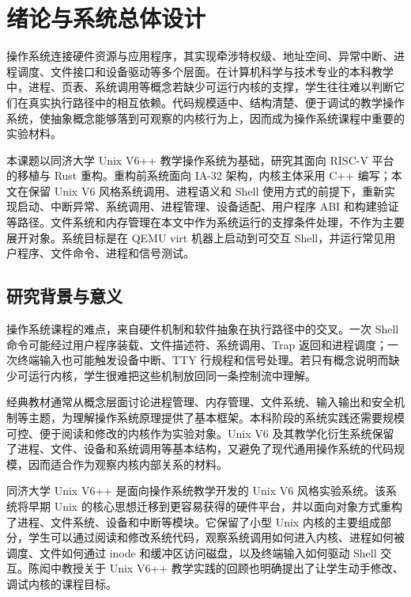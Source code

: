 \chapter{绪论与系统总体设计}\label{chap:introduction}

操作系统连接硬件资源与应用程序，其实现牵涉特权级、地址空间、异常中断、进程调度、文件接口和设备驱动等多个层面。在计算机科学与技术专业的本科教学中，进程、页表、系统调用等概念若缺少可运行内核的支撑，学生往往难以判断它们在真实执行路径中的相互依赖。代码规模适中、结构清楚、便于调试的教学操作系统，使抽象概念能够落到可观察的内核行为上，因而成为操作系统课程中重要的实验材料。

本课题以同济大学 Unix V6++ 教学操作系统为基础，研究其面向 RISC-V 平台的移植与 Rust 重构。重构前系统面向 IA-32 架构，内核主体采用 C++ 编写；本文在保留 Unix V6 风格系统调用、进程语义和 Shell 使用方式的前提下，重新实现启动、中断异常、系统调用、进程管理、设备适配、用户程序 ABI 和构建验证等路径。文件系统和内存管理在本文中作为系统运行的支撑条件处理，不作为主要展开对象。系统目标是在 QEMU virt 机器上启动到可交互 Shell，并运行常见用户程序、文件命令、进程和信号测试。

\section{研究背景与意义}

操作系统课程的难点，来自硬件机制和软件抽象在执行路径中的交叉。一次 Shell 命令可能经过用户程序装载、文件描述符、系统调用、Trap 返回和进程调度；一次终端输入也可能触发设备中断、TTY 行规程和信号处理。若只有概念说明而缺少可运行内核，学生很难把这些机制放回同一条控制流中理解。

经典教材通常从概念层面讨论进程管理、内存管理、文件系统、输入输出和安全机制等主题\cite{tanenbaum2017modern,arpaci2019ostep}，为理解操作系统原理提供了基本框架。本科阶段的系统实践还需要规模可控、便于阅读和修改的内核作为实验对象。Unix V6 及其教学化衍生系统保留了进程、文件、设备和系统调用等基本结构，又避免了现代通用操作系统的代码规模，因而适合作为观察内核内部关系的材料\cite{ritchie_unix_1974,lions_unix_1996}。

同济大学 Unix V6++ 是面向操作系统教学开发的 Unix V6 风格实验系统。该系统将早期 Unix 的核心思想迁移到更容易获得的硬件平台，并以面向对象方式重构了进程、文件系统、设备和中断等模块。它保留了小型 Unix 内核的主要组成部分，学生可以通过阅读和修改系统代码，观察系统调用如何进入内核、进程如何被调度、文件如何通过 inode 和缓冲区访问磁盘，以及终端输入如何驱动 Shell 交互。陈闳中教授关于 Unix V6++ 教学实践的回顾也明确提出了让学生动手修改、调试内核的课程目标\cite{chenhz_unixv6pp}。

